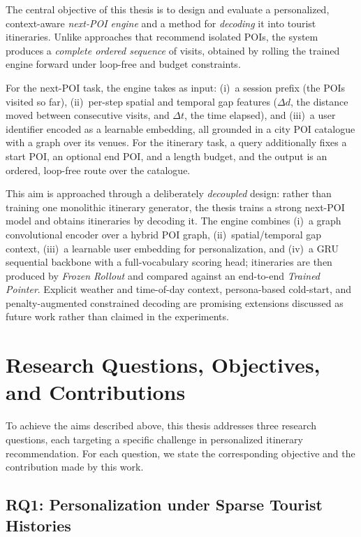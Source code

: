 The central objective of this thesis is to design and evaluate a personalized, context-aware \emph{next-POI engine} and a method for \emph{decoding} it into tourist itineraries. Unlike approaches that recommend isolated POIs, the system produces a \emph{complete ordered sequence} of visits, obtained by rolling the trained engine forward under loop-free and budget constraints.

For the next-POI task, the engine takes as input: (i)~a session prefix (the POIs visited so far), (ii)~per-step spatial and temporal gap features ($\Delta d$, the distance moved between consecutive visits, and $\Delta t$, the time elapsed), and (iii)~a user identifier encoded as a learnable embedding, all grounded in a city POI catalogue with a graph over its venues. For the itinerary task, a query additionally fixes a start POI, an optional end POI, and a length budget, and the output is an ordered, loop-free route over the catalogue.

This aim is approached through a deliberately \emph{decoupled} design: rather than training one monolithic itinerary generator, the thesis trains a strong next-POI model and obtains itineraries by decoding it. The engine combines (i)~a graph convolutional encoder over a hybrid POI graph, (ii)~spatial/temporal gap context, (iii)~a learnable user embedding for personalization, and (iv)~a GRU sequential backbone with a full-vocabulary scoring head; itineraries are then produced by \emph{Frozen Rollout} and compared against an end-to-end \emph{Trained Pointer}. Explicit weather and time-of-day context, persona-based cold-start, and penalty-augmented constrained decoding are promising extensions discussed as future work rather than claimed in the experiments.


\section{Research Questions, Objectives, and Contributions}
\label{sec:intro-rqs}

To achieve the aims described above, this thesis addresses three research questions, each targeting a specific challenge in personalized itinerary recommendation. For each question, we state the corresponding objective and the contribution made by this work.

\subsection{RQ1: Personalization under Sparse Tourist Histories}
\label{sec:intro-rq1}

